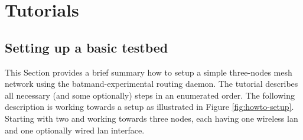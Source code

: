 \documentclass[11pt]{article}
\begin{document}


\section{Tutorials}
\label{sec:howto}

\subsection{Setting up a basic testbed}
\label{sec:howto-basics}

This Section provides a brief summary how to setup a simple three-nodes mesh network using the batmand-experimental routing daemon. 
%
The tutorial describes all necessary (and some optionally) steps in an enumerated order. 
%
The following description is working towards a setup as illustrated in Figure \ref{fig:howto-setup}.
Starting with two and working towards three nodes, each having one wireless lan and one optionally wired lan interface.
\end{document}
